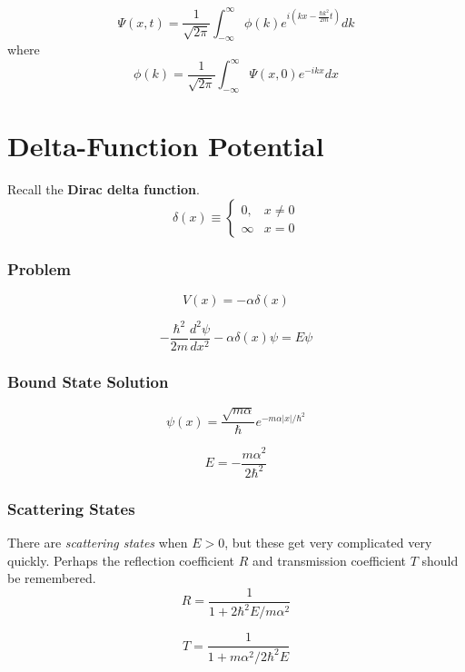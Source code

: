 \begin{equation}\label{eq:sol-free-transform}
    \Psi(x,t) = \frac{1}{\sqrt{2\pi}}\int_{-\infty}^\infty \phi(k)e^{i(kx-\frac{\hbar k^2}{2m}t)}dk
\end{equation}
where
\begin{equation}\label{eq:free-sol-phi}
    \phi(k) = \frac{1}{\sqrt{2\pi}}\int_{-\infty}^\infty \Psi(x,0)e^{-ikx}dx
\end{equation}

\section{Delta-Function Potential}
Recall the \textbf{Dirac delta function}.
\begin{equation}\label{eq:diracdelta-def}
    \delta(x) \equiv \left\{\begin{array}{rr}
         0, & x\neq 0 \\
         \infty & x=0
    \end{array}\right.
\end{equation}

\subsubsection{Problem}
\begin{equation}\label{eq:delta-potential}
    V(x) = -\alpha \delta(x)
\end{equation}

\begin{equation}\label{eq:SE-delta}
    -\frac{\hbar^2}{2m} \frac{d^2\psi}{dx^2} - \alpha\delta(x)\psi = E\psi
\end{equation}

\subsubsection{Bound State Solution}
\begin{equation}\label{eq:delta-bound-sol}
    \psi(x) = \frac{\sqrt{m\alpha}}{\hbar}e^{-m\alpha |x|/\hbar^2}
\end{equation}

\begin{equation} \label{eq:delta-bound-energy}
    E = - \frac{m\alpha^2}{2\hbar^2}
\end{equation}

\subsubsection{Scattering States}
There are \textit{scattering states} when $E>0$, but these get very complicated very quickly. Perhaps the reflection coefficient $R$ and transmission coefficient $T$ should be remembered.
\begin{equation*}
    R = \frac{1}{1+2\hbar^2 E/m\alpha^2}
\end{equation*}

\begin{equation*}
    T = \frac{1}{1+m\alpha^2/2\hbar^2 E}
\end{equation*}